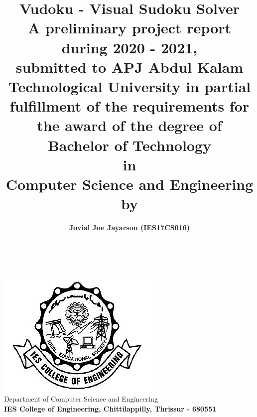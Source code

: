 \documentclass[12pt, a4paper]{report}
\title{\textbf{Vudoku - Visual Sudoku Solver} \\ \vspace{1cm} \large A preliminary project report during 2020 - 2021, \\ submitted to APJ Abdul Kalam Technological University in partial fulfillment of the requirements for the award of the degree of \\ \vspace{0.5cm} \large \textbf{Bachelor of Technology \\ in \\ Computer Science and Engineering} \\ \vspace{0.5cm} \large by}
\author{\textbf{Jovial Joe Jayarson (IES17CS016)}}
\date{}
\begin{document}

\makeatletter
\thispagestyle{empty}
\begin{titlepage}
    \begin{center}
        \vspace*{\fill}
        {\huge \@title }\\[0.5cm]
        {\@author} \\[0.5cm]
        \includegraphics[width=0.5\linewidth]{iesce.png}\\[10ex]
        {\large Department of Computer Science and Engineering \\ \textbf{IES College of Engineering, Chittilappilly, Thrissur - 680551}}
        \vspace*{\fill}
    \end{center}
\end{titlepage}

\end{document}
